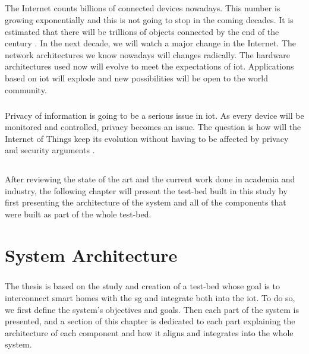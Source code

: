 \documentclass[12pt,a4paper,final]{report}
\begin{document}
\paragraph{}
The Internet counts billions of connected devices nowadays. This number is growing exponentially and this is not going to stop in the coming decades. It is estimated that there will be trillions of objects connected by the end of the century \cite{ref3}. In the next decade, we will watch a major change in the Internet. The network architectures we know nowadays will changes radically. The hardware architectures used now will evolve to meet the expectations of \gls{iot}. Applications based on \gls{iot} will explode and new possibilities will be open to the world community.
\paragraph{}
Privacy of information is going to be a serious issue in \gls{iot}. As every device will be monitored and controlled, privacy becomes an issue. The question is how will the Internet of Things keep its evolution without having to be affected by privacy and security arguments \cite{ref20}.

\section*{}
\paragraph{}
After reviewing the state of the art and the current work done in academia and industry, the following chapter will present the test-bed built in this study by first presenting the architecture of the system and all of the components that were built as part of the whole test-bed.

\chapter{System Architecture}
\paragraph{}
The thesis is based on the study and creation of a test-bed whose goal is to interconnect smart homes with the \gls{sg} and integrate both into the \gls{iot}. To do so, we first define the system's objectives and goals. Then each part of the system is presented, and a section of this chapter is dedicated to each part explaining the architecture of each component and how it aligns and integrates into the whole system.
\end{document}
